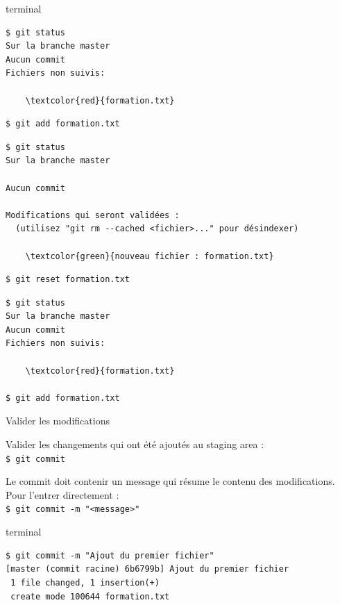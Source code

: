 \documentclass[usepdftitle=false]{beamer}
\def\seplength{.3\topsep}
\newcommand{\Pause}{%
\ifdef{\Release}
  {\pause}
  {}
}
\begin{document}
\begin{frame}[fragile]
\begin{beamercolorbox}[rounded=true,shadow=true]{terminal}
\vspace{-\seplength}
\begin{Verbatim}
$ git status
Sur la branche master
Aucun commit
Fichiers non suivis:

	\textcolor{red}{formation.txt}
\end{Verbatim}
\Pause
\vspace{-\seplength}
\begin{Verbatim}
$ git add formation.txt
\end{Verbatim}
\Pause
\vspace{-\seplength}
\begin{Verbatim}
$ git status
Sur la branche master

Aucun commit

Modifications qui seront validées :
  (utilisez "git rm --cached <fichier>..." pour désindexer)

	\textcolor{green}{nouveau fichier : formation.txt}
\end{Verbatim}
\Pause
\vspace{-\seplength}
\begin{Verbatim}
$ git reset formation.txt
\end{Verbatim}
\Pause
\vspace{-\seplength}
\begin{Verbatim}
$ git status
Sur la branche master
Aucun commit
Fichiers non suivis:

	\textcolor{red}{formation.txt}

$ git add formation.txt
\end{Verbatim}
\end{beamercolorbox}
\end{frame}

\begin{frame}[fragile]{Valider les modifications}

Valider les changements qui ont été ajoutés au staging area :\\
\verb+$ git commit+

\medskip

Le commit doit contenir un message qui résume le contenu des modifications.
Pour l'entrer directement : \\
\verb+$ git commit -m "<message>"+ \\

\bigskip

\begin{beamercolorbox}[rounded=true,shadow=true]{terminal}
\vspace{-\seplength}
\begin{Verbatim}
$ git commit -m "Ajout du premier fichier"
[master (commit racine) 6b6799b] Ajout du premier fichier
 1 file changed, 1 insertion(+)
 create mode 100644 formation.txt
\end{Verbatim}
\end{beamercolorbox}

\end{frame}
\end{document}
